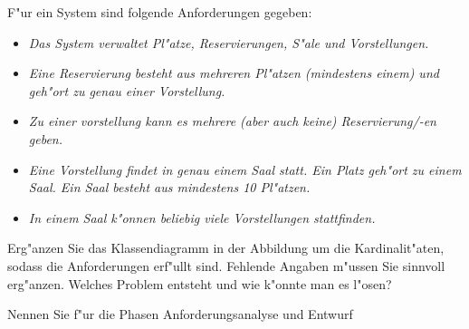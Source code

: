 \documentclass[12pt]{exam}
\begin{document}
\begin{questions}
\question[5] F"ur ein System sind folgende Anforderungen gegeben:
\begin{itemize}
    \item \emph{Das System verwaltet Pl"atze, Reservierungen, S"ale und Vorstellungen.}
    \item \emph{Eine Reservierung besteht aus mehreren Pl"atzen (mindestens einem) und geh"ort zu genau einer Vorstellung.}
    \item \emph{Zu einer vorstellung kann es mehrere (aber auch keine) Reservierung/-en geben.}
    \item \emph{Eine Vorstellung findet in genau einem Saal statt. Ein Platz geh"ort zu einem Saal. Ein Saal besteht aus mindestens 10 Pl"atzen.}
    \item \emph{In einem Saal k"onnen beliebig viele Vorstellungen stattfinden.}
\end{itemize}
Erg"anzen Sie das Klassendiagramm in der Abbildung um die Kardinalit"aten, sodass die Anforderungen erf"ullt sind. Fehlende Angaben m"ussen Sie sinnvoll erg"anzen. Welches Problem entsteht und wie k"onnte man es l"osen? \\
\addpoints
{}

\question[5] Nennen Sie f"ur die Phasen Anforderungsanalyse und Entwurf
\noaddpoints
{}


\end{questions}
\end{document}
